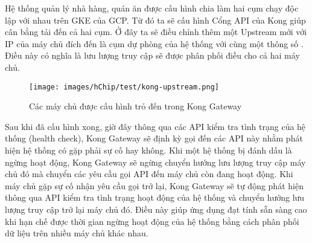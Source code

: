 Hệ thống quản lý nhà hàng, quán ăn được cấu hình chia làm hai cụm chạy độc lập với nhau trên GKE của GCP.
Từ đó ta sẽ cấu hình Cổng API của Kong giúp cân bằng tải đến cả hai cụm.
Ở đây ta sẽ điều chỉnh thêm một Upstream mới với IP của máy chủ đích đến là cụm dự phòng của hệ thống với cùng một thông số .
Điều này có nghĩa là lưu lượng truy cập sẽ được phân phối điều cho cả hai máy chủ.
\begin{figure}[H]
    \centering
    \texttt{[image: images/hChip/test/kong-upstream.png]}
    \caption{Các máy chủ được cấu hình trỏ đến trong Kong Gateway}
    \label{fig:kong-upstream}
\end{figure}
Sau khi đã cấu hình xong, giờ đây thông qua các API kiểm tra tình trạng của hệ thống (health check), Kong Gateway sẽ định kỳ gọi đến các API này nhằm phát hiện hệ thống có gặp phải sự cố hay không.
Khi một hệ thống bị đánh dấu là ngừng hoạt động, Kong Gateway sẽ ngừng chuyển hướng lưu lượng truy cập máy chủ đó mà chuyển các yêu cầu gọi API đến máy chủ còn đang hoạt động.
Khi máy chủ gặp sự cố nhận yêu cầu gọi trở lại, Kong Gateway sẽ tự động phát hiện thông qua API kiểm tra tình trạng hoạt động của hệ thống và chuyển hướng lưu lượng truy cập trở lại máy chủ đó.
Điều này giúp ứng dụng đạt tính sẵn sàng cao khi hạn chế được thời gian ngừng hoạt động của hệ thống bằng cách phân phối dữ liệu trên nhiều máy chủ khác nhau.